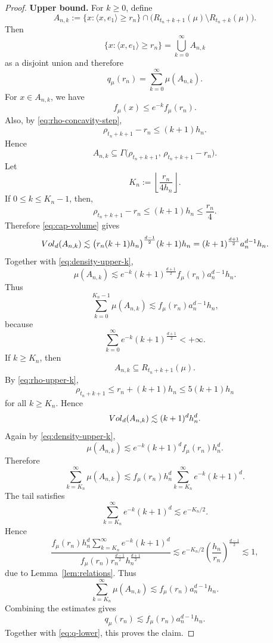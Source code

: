 \documentclass[10pt,a4paper]{amsart}
\newcommand{\vol}{{\rm Vol}}
\begin{document}
\begin{proof}
\noindent\textbf{Upper bound.}
For \(k\ge0\), define
\[
A_{n,k}:=
\{x:\langle x,e_1\rangle\ge r_n\}
\cap
\bigl(R_{t_n+k+1}(\mu)\setminus R_{t_n+k}(\mu)\bigr).
\]
Then
\[
\{x:\langle x,e_1\rangle\ge r_n\}
=
\bigcup_{k=0}^\infty A_{n,k}
\]
as a disjoint union and therefore
\[
q_\mu(r_n)=\sum_{k=0}^\infty \mu(A_{n,k}).
\]
For \(x\in A_{n,k}\), we have
\begin{equation}\label{eq:density-upper-k}
f_\mu(x)\le e^{-k}f_\mu(r_n).
\end{equation}
Also, by \eqref{eq:rho-concavity-step},
\begin{equation}\label{eq:rho-upper-k}
\rho_{t_n+k+1}-r_n\le (k+1)h_n.
\end{equation}
Hence
\[
A_{n,k}
\subseteq
\Gamma\bigl(\rho_{t_n+k+1},\,\rho_{t_n+k+1}-r_n\bigr).
\]
Let
\[
K_n:=\left\lfloor \frac{r_n}{4h_n}\right\rfloor.
\]
If \(0\le k\le K_n-1\), then, 
\[
\rho_{t_n+k+1}-r_n\le (k+1)h_n\le \frac{r_n}{4}.
\]
Therefore \eqref{eq:cap-volume} gives
\[
\vol_d(A_{n,k})
\lesssim
\bigl(r_n(k+1)h_n\bigr)^{\frac{d-1}{2}}(k+1)h_n
=
(k+1)^{\frac{d+1}{2}}a_n^{d-1}h_n.
\]
Together with \eqref{eq:density-upper-k},
\begin{equation}\label{eq:upper-small-k}
\mu(A_{n,k})
\lesssim
e^{-k}(k+1)^{\frac{d+1}{2}}
f_\mu(r_n)a_n^{d-1}h_n.
\end{equation}
Thus
\[
\sum_{k=0}^{K_n-1}\mu(A_{n,k})
\lesssim
f_\mu(r_n)a_n^{d-1}h_n,
\]
because
\[
\sum_{k=0}^\infty e^{-k}(k+1)^{\frac{d+1}{2}}<+\infty.
\]
If \(k \geq K_n\), then
\[
A_{n,k}\subseteq R_{t_n+k+1}(\mu).
\]
By \eqref{eq:rho-upper-k},
\[
\rho_{t_n+k+1}\le r_n+(k+1)h_n\leq 5(k+1)h_n
\]
for all \(k \geq K_n\). Hence
\[
\vol_d(A_{n,k})
\lesssim
(k+1)^d h_n^d.
\]
Again by \eqref{eq:density-upper-k},
\begin{equation}\label{eq:upper-large-k}
\mu(A_{n,k})
\lesssim
e^{-k}(k+1)^d f_\mu(r_n)h_n^d.
\end{equation}
Therefore
\[
\sum_{k=K_n}^{\infty}\mu(A_{n,k})
\lesssim
f_\mu(r_n)h_n^d
\sum_{k=K_n}^{\infty} e^{-k}(k+1)^d.
\]
The tail satisfies
\[
\sum_{k=K_n}^{\infty} e^{-k}(k+1)^d
\lesssim e^{-K_n/2}.
\]
 Hence
\[
\frac{
f_\mu(r_n)h_n^d
\sum_{k=K_n}^{\infty} e^{-k}(k+1)^d
}{
f_\mu(r_n)r_n^{\frac{d-1}{2}}h_n^{\frac{d+1}{2}}
}
\lesssim
e^{-K_n/2}
\left(\frac{h_n}{r_n}\right)^{\frac{d-1}{2}} \lesssim 1,
\]  due to Lemma~\ref{lem:relations}.
Thus
\[
\sum_{k=K_n}^{\infty}\mu(A_{n,k})
\lesssim f_\mu(r_n)a_n^{d-1}h_n.
\]
Combining the estimates gives
\begin{equation}\label{eq:q-upper}
q_\mu(r_n)\lesssim f_\mu(r_n)a_n^{d-1}h_n.
\end{equation}
Together with \eqref{eq:q-lower}, this proves the claim.
\end{proof}
\end{document}
